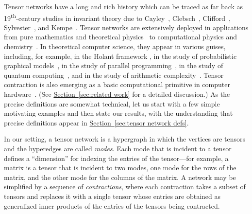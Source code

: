\documentclass[11pt]{article}
\numberwithin{equation}{section}
\theoremstyle{definition}
\theoremstyle{plain}
\newcommand{\expref}[2]{\hyperref[#2]{#1~\ref{#2}}}
\newcommand{\nth}[1]{\ifstrequal{#1}{19}{19\textsuperscript{th}}{\PackageError{toc-native-compat}{Unsupported nth argument #1}{Only the exact original 19 argument is approved.}}}
\begin{document}
Tensor networks have a long and rich history which can be traced as
far back as \nth{19}-century studies in invariant theory due
to Cayley~\cite{Cayley1875,Cayley1879}, Clebsch~\cite{Clebsch1861},
Clifford~\cite{Clifford1878}, Sylvester~\cite{Sylvester1878},
and Kempe~\cite{Kempe1885,Kempe1892}.
Tensor networks are extensively deployed in applications from pure mathematics
and theoretical physics~\cite{Kauffman1989,Kuperberg1991,Landsberg2012,LandsbergQY2012,Penrose1956,Penrose1971,RichterGebertL2009,Schrijver2015a} to computational physics and chemistry~\cite{Orus2014,PfeiferHV2014,SolomonikMHSD2014}.
In theoretical computer science,
they appear in various guises,  %
including, for example,
in the Holant framework \cite{Valiant2008,CaiLX2011,CaiGW2016a},
in the study of probabilistic graphical models~\cite{KollerF2009,RobevaS2017},
in the study of parallel programming~\cite{SolomonikH2015},
in the study of quantum computing~\cite{ItaiL2010},
and in the study of arithmetic
complexity~\cite{BeaudryH2007,CapelliDM2016,DammHM2002}.
Tensor contraction is also emerging as a basic
computational primitive in computer
hardware~\cite{JouppiYPPABBBBB17,MarkidisCLPV18}.
(See \expref{Section}{sec:related work} for a detailed discussion.)
As the precise definitions are somewhat technical, let us start with
a few simple motivating examples and then state our results,
with the understanding that precise definitions appear
in \expref{Section}{sec:tensor network defs}.

In our setting, a tensor network is a hypergraph in which the vertices are
tensors and the hyperedges are called \emph{modes}.
Each mode that is incident to a tensor defines a ``dimension''
for indexing the entries of the tensor---for example, a matrix is a tensor
that is incident to two modes, one mode for the rows of the matrix, and
the other mode for the columns of the matrix. A network may be simplified
by a sequence of \emph{contractions}, where each contraction takes a subset
of tensors and replaces it with a single tensor whose entries are obtained
as generalized inner products of the entries of the tensors being contracted.
\end{document}
